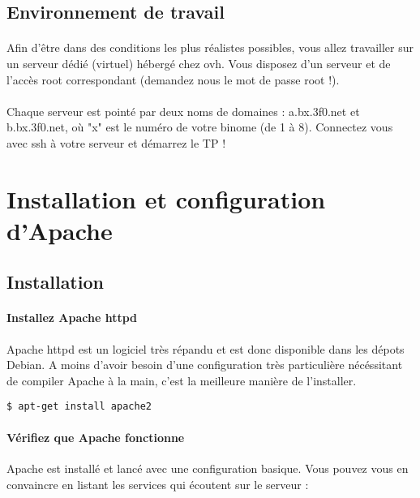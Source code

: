 \documentclass[12pt,a4paper]{article}
\begin{document}
\subsection*{Environnement de travail}
\paragraph{}
Afin d'être dans des conditions les plus réalistes possibles, vous allez travailler sur un serveur dédié (virtuel) hébergé chez ovh. Vous disposez d'un serveur et de l'accès root correspondant (demandez nous le mot de passe root !).

\paragraph{}
Chaque serveur est pointé par deux noms de domaines : a.bx.3f0.net et b.bx.3f0.net, où "x" est le numéro de votre binome (de 1 à 8). Connectez vous avec ssh à votre serveur et démarrez le TP !

\section{Installation et configuration d'Apache}
\subsection{Installation}

\paragraph{Installez Apache httpd\\}
Apache httpd est un logiciel très répandu et est donc disponible dans les dépots Debian. A moins d'avoir besoin d'une configuration très particulière nécéssitant de compiler Apache à la main, c'est la meilleure manière de l'installer.

\begin{lstlisting}
$ apt-get install apache2
\end{lstlisting}

\paragraph{Vérifiez que Apache fonctionne\\}
Apache est installé et lancé avec une configuration basique. Vous pouvez vous en convaincre en listant les services qui écoutent sur le serveur : 
\end{document}
